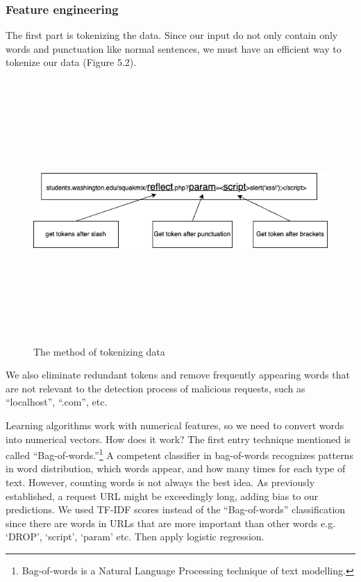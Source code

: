 \subsubsection{Feature engineering}
\hspace{0.5cm}The first part is tokenizing the data. Since our input do not only contain only words and punctuation like normal sentences, we must have an efficient way to tokenize our data (Figure 5.2).

\begin{figure}[ht]
	\centering
	\includegraphics[width=\linewidth, height=10cm,keepaspectratio]{figures/implement1.png}
  \caption{The method of tokenizing data}
\end{figure} 

\newpage
We also eliminate redundant tokens and remove frequently appearing words that are not relevant to the detection process of malicious requests, such as ``localhost'', ``.com'', etc.

Learning algorithms work with numerical features, so we need to convert words into numerical vectors. How does it work? The first entry technique mentioned is called ``Bag-of-words.''\footnote{Bag-of-words is a Natural Language Processing technique of text modelling.}
A competent classifier in bag-of-words recognizes patterns in word distribution, which words appear, and how many times for each type of text. However, counting words is not always the best idea. As previously established, a request URL might be exceedingly long, adding bias to our predictions. We used TF-IDF scores instead of the ``Bag-of-words'' classification since there are words in URLs that are more important than other words e.g. `DROP', `script', `param' etc. Then apply logistic regression.

